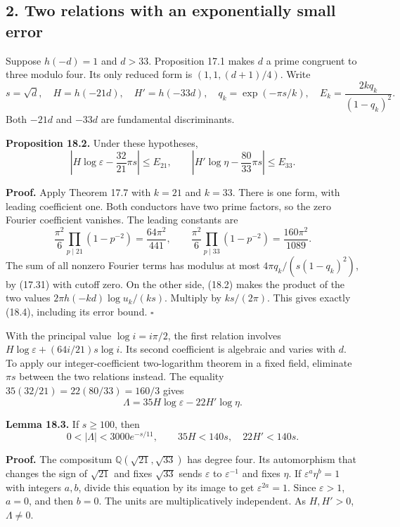 \documentclass[
  11pt,
  a4paper,
]{article}
\begin{document}
\subsection{2. Two relations with an exponentially small
error}\label{two-relations-with-an-exponentially-small-error}

Suppose \(h(-d)=1\) and \(d>33\). Proposition 17.1 makes \(d\) a prime
congruent to three modulo four. Its only reduced form is
\((1,1,(d+1)/4)\). Write \[
 s=\sqrt d,\quad H=h(-21d),\quad H'=h(-33d),\quad
 q_k=\exp(-\pi s/k),\quad
 E_k=\frac{2kq_k}{(1-q_k)^2}.
 \tag{18.3}
\] Both \(-21d\) and \(-33d\) are fundamental discriminants.

\textbf{Proposition 18.2.} Under these hypotheses, \[
 \left|H\log\varepsilon-\frac{32}{21}\pi s\right|\le E_{21},
 \qquad
 \left|H'\log\eta-\frac{80}{33}\pi s\right|\le E_{33}.
 \tag{18.4}
\]

\textbf{Proof.} Apply Theorem 17.7 with \(k=21\) and \(k=33\). There is
one form, with leading coefficient one. Both conductors have two prime
factors, so the zero Fourier coefficient vanishes. The leading constants
are \[
 \frac{\pi^2}{6}\prod_{p\mid21}(1-p^{-2})
       =\frac{64\pi^2}{441},\qquad
 \frac{\pi^2}{6}\prod_{p\mid33}(1-p^{-2})
       =\frac{160\pi^2}{1089}.
\] The sum of all nonzero Fourier terms has modulus at most
\(4\pi q_k/(s(1-q_k)^2)\), by (17.31) with cutoff zero. On the other
side, (18.2) makes the product of the two values
\(2\pi h(-kd)\log u_k/(ks)\). Multiply by \(ks/(2\pi)\). This gives
exactly (18.4), including its error bound. \(\square\)

With the principal value \(\log i=i\pi/2\), the first relation involves
\(H\log\varepsilon+(64i/21)s\log i\). Its second coefficient is
algebraic and varies with \(d\). To apply our integer-coefficient
two-logarithm theorem in a fixed field, eliminate \(\pi s\) between the
two relations instead. The equality \(35(32/21)=22(80/33)=160/3\) gives
\[
 \Lambda=35H\log\varepsilon-22H'\log\eta.
 \tag{18.5}
\]

\textbf{Lemma 18.3.} If \(s\ge100\), then \[
 0<|\Lambda|<3000e^{-s/11},\qquad
 35H<140s,\quad22H'<140s.
 \tag{18.6}
\]

\textbf{Proof.} The compositum \(\mathbb Q(\sqrt{21},\sqrt{33})\) has
degree four. Its automorphism that changes the sign of \(\sqrt{21}\) and
fixes \(\sqrt{33}\) sends \(\varepsilon\) to \(\varepsilon^{-1}\) and
fixes \(\eta\). If \(\varepsilon^a\eta^b=1\) with integers \(a,b\),
divide this equation by its image to get \(\varepsilon^{2a}=1\). Since
\(\varepsilon>1\), \(a=0\), and then \(b=0\). The units are
multiplicatively independent. As \(H,H'>0\), \(\Lambda\ne0\).
\end{document}
